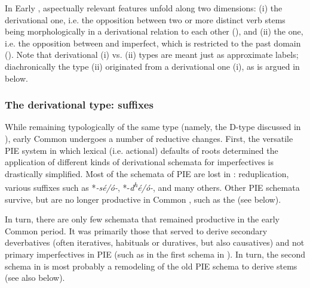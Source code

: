 \documentclass[output=paper]{langsci/langscibook}
\begin{document}
In Early , aspectually relevant features unfold along two dimensions: (i) the derivational one, i.e. the opposition between two or more distinct verb stems being morphologically in a derivational relation to each other (), and (ii) the  one, i.e. the opposition between   and imperfect, which is restricted to the past domain (). Note that derivational (i) vs.  (ii) types are meant just as approximate labels; diachronically the  type (ii) originated from a derivational one (i), as is argued in  below.

\subsubsection{The derivational type: suffixes}\label{sec:wiemerserzant:3.2.1}

While remaining typologically of the same type (namely, the D-type discussed in ), early Common  undergoes a number of reductive changes. First, the versatile PIE system in which lexical (i.e. actional) defaults of roots determined the application of different kinds of derivational schemata for imperfectives is drastically simplified. Most of the  schemata of PIE are lost in : reduplication, various  suffixes such as *\textit{-sé/ó-}, *-\textit{d\textsuperscript{h}é/ó-}, and many others. Other  PIE schemata survive, but are no longer productive in Common , such as the  (see  below). 

In turn, there are only few schemata that remained productive in the early Common  period. It was primarily those that served to derive secondary deverbatives (often iteratives, habituals or duratives, but also causatives) and not primary imperfectives in PIE (such as in the first schema in ). In turn, the second schema in  is most probably a remodeling of the old PIE schema to derive  stems (see also  below).
\end{document}
